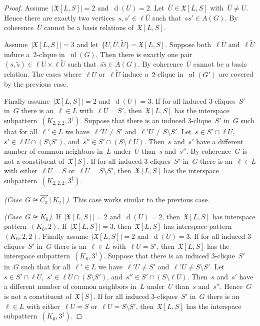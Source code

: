 \documentclass[english,a4paper]{article}
\theoremstyle{plain}
\theoremstyle{definition}
\newcommand{\coherentConfig}{\ensuremath{\mathfrak{X}}}
\newcommand{\interspace}[2]{\ensuremath{\coherentConfig[#1,#2]}}
\newcommand{\inducedCC}[1]{\ensuremath{\coherentConfig[#1]}}
\newcommand{\intDegree}[1]{\ensuremath{\Deg \left( #1 \right)}}
\DeclareMathOperator*{\ul}{ul}
\newcommand{\arcs}{\ensuremath{A}}
\DeclareMathOperator{\Deg}{d}
\newcommand{\ipsixCliqueTwo}     {\ensuremath{(\clique{6},2)}}
\newcommand{\ipsixCliqueTwoTwice}{\ensuremath{(\clique{6},2,2)}}
\newcommand{\ipsixCliqueThree}   {\ensuremath{(\clique{6},3^\dag)}}
\newcommand{\ipsixCliqueThreeD}	 {\ensuremath{(\clique{6},3^\ddag)}}
\newcommand{\ipsixMatchingComplement} {\ensuremath{(\clique{2,2,2},3^\dag)}}
\newcommand{\ipsixMatchingComplementD}{\ensuremath{(\clique{2,2,2},3^\ddag)}}
\newcommand{\clique}[1]{\ensuremath{K_{#1}}}
\begin{document}
\begin{proof}
    Assume~$|\interspace{L}{S}| = 2$ and~$\intDegree{U} = 2$.
    Let~$\overline{U} \in \interspace{L}{S}$ with~$\overline{U} \neq U$.
    Hence there are exactly two vertices~$s,s' \in \ell \overline{U}$ such that~$ss' \in \arcs(G)$.
    By coherence~$\overline{U}$ cannot be a basis relations of~$\interspace{L}{S}$.

    Assume~$|\interspace{L}{S}| = 3$ and let~$\{U,\overline{U},\widetilde{U}\} = \interspace{L}{S}$.
    Suppose both~$\ell \overline{U}$ and~$\ell \widetilde{U}$ induce a~$2$-clique in~$\ul(G)$.
    Then there is exactly one pair~$(\overline{s},\widetilde{s}) \in \ell \overline{U} \times \ell \widetilde{U}$ such that~$\overline{s}\widetilde{s} \in \arcs(G)$.
    By coherence~$\overline{U}$ cannot be a basis relation.
    The cases where~$\ell \overline{U}$ or~$\ell \widetilde{U}$ induce a~$2$-clique in~$\ul(G')$ are covered by the previous case.

    Finally assume~$|\interspace{L}{S}| = 2$ and~$\intDegree{U} = 3$.
    If for all induced $3$-cliques~$S'$ in~$G$ there is an~$\ell \in L$ with~$\ell U = S'$, then~$\interspace{L}{S}$ has the interspace subpattern~$\ipsixMatchingComplement$.
    Suppose that there is an induced $3$-clique~$S'$ in~$G$ such that for all~$\ell' \in L$ we have~$\ell' U \neq S'$ and~$\ell' U \neq S\setminus S'$.
    Let~$s \in S' \cap \ell U$,~$s' \in \ell U \cap (S \setminus S')$, and~$s'' \in S' \cap (S \setminus \ell U)$.
    Then~$s$ and~$s'$ have a different number of common neighbors in~$L$ under~$U$ than~$s$ and~$s''$.
    By coherence~$G$ is not a constituent of~$\inducedCC{S}$.
    If for all induced $3$-cliques~$S'$ in~$G$ there is an~$\ell \in L$ with either~$\ell U = S$ or~$\ell U = S \setminus S'$, then~$\interspace{L}{S}$ has the interspace subpattern~$\ipsixMatchingComplementD$.

    \textit{(Case~$G \cong \overrightarrow{C_3}[K_2]$)}.
    This case works similar to the previous case.

    \textit{(Case~$G \cong K_6$)}.
    If~$|\interspace{L}{S}| = 2$ and~$\intDegree{U} = 2$, then~$\interspace{L}{S}$ has interspace pattern~$\ipsixCliqueTwo$.
    If~$|\interspace{L}{S}| = 3$, then~$\interspace{L}{S}$ has interspace pattern~$\ipsixCliqueTwoTwice$.
    Finally assume~$|\interspace{L}{S}| = 2$ and~$\intDegree{U} = 3$.
    If for all induced $3$-cliques~$S'$ in~$G$ there is an~$\ell \in L$ with~$\ell U = S'$, then~$\interspace{L}{S}$ has the interspace subpattern~$\ipsixCliqueThree$.
    Suppose that there is an induced $3$-clique~$S'$ in~$G$ such that for all~$\ell' \in L$ we have~$\ell' U \neq S'$ and~$\ell' U \neq S\setminus S'$.
    Let~$s \in S' \cap \ell U$,~$s' \in \ell U \cap (S \setminus S')$, and~$s'' \in S' \cap (S \setminus \ell U)$.
    Then~$s$ and~$s'$ have a different number of common neighbors in~$L$ under~$U$ than~$s$ and~$s''$.
    Hence~$G$ is not a constituent of~$\inducedCC{S}$.
    If for all induced $3$-cliques~$S'$ in~$G$ there is an~$\ell \in L$ with either~$\ell U = S$ or~$\ell U = S \setminus S'$, then~$\interspace{L}{S}$ has the interspace subpattern~$\ipsixCliqueThreeD$.
\end{proof}
\end{document}

